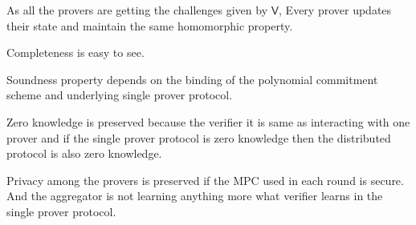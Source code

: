 \documentclass[runningheads]{llncs}
\def\verifier{\mathsf{V}}
\begin{document}
As all the provers are getting the challenges given by $\verifier$, Every prover updates their state and maintain the same homomorphic property.

 

Completeness is easy to see.

Soundness property depends on the binding of the polynomial commitment scheme and underlying single prover protocol.

Zero knowledge is preserved because the verifier it is same as interacting with one prover and if the single prover protocol is zero knowledge then the distributed protocol is also zero knowledge. 

Privacy among the provers is preserved if the MPC used in each round is secure. And the aggregator is not learning anything more what verifier learns in the single prover protocol. 
	
	 
\end{document}
